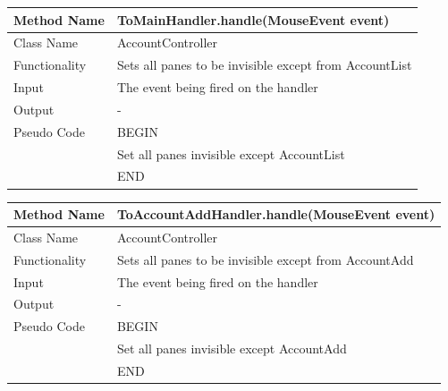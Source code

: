 \documentclass[12pt]{article}
\begin{document}
\begin{tabular}{ |p{3cm}||p{\colWidth}|  }
	\hline
	Method Name & ToMainHandler.handle(MouseEvent event)\\
	\hline
	Class Name & AccountController\\
	\hline
	Functionality & Sets all panes to be invisible except from AccountList\\
	\hline
	Input & The event being fired on the handler\\
	\hline
	Output & -\\
	\hline
	Pseudo Code & BEGIN\\
	& Set all panes invisible except AccountList \\
	& END\\
	\hline
\end{tabular} 

\begin{tabular}{ |p{3cm}||p{\colWidth}|  }
	\hline
	Method Name & ToAccountAddHandler.handle(MouseEvent event)\\
	\hline
	Class Name & AccountController\\
	\hline
	Functionality & Sets all panes to be invisible except from AccountAdd\\
	\hline
	Input & The event being fired on the handler\\
	\hline
	Output & -\\
	\hline
	Pseudo Code & BEGIN\\
	& Set all panes invisible except AccountAdd \\
	& END \\
	\hline
\end{tabular} 
\end{document}
